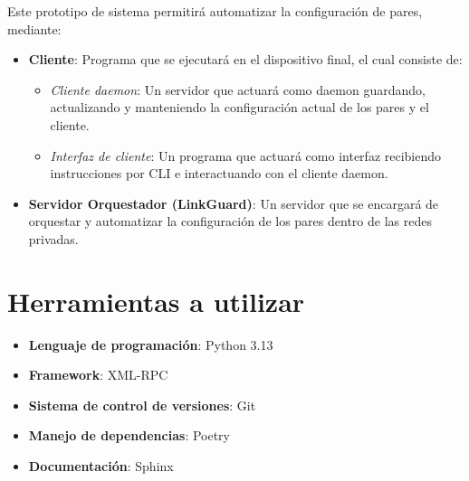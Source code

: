 Este prototipo de sistema permitirá automatizar la configuración de pares, mediante:
\begin{itemize}
    \item \textbf{Cliente}: Programa que se ejecutará en el dispositivo final, el cual consiste de:
    \begin{itemize}
        \item \textit{Cliente daemon}: Un servidor que actuará como daemon guardando, actualizando y manteniendo la configuración actual de los pares y el cliente.
        \item \textit{Interfaz de cliente}: Un programa que actuará como interfaz recibiendo instrucciones por CLI e interactuando con el cliente daemon.
    \end{itemize}
    \item \textbf{Servidor Orquestador (LinkGuard)}: Un servidor que se encargará de orquestar y automatizar la configuración de los pares dentro de las redes privadas.
\end{itemize}


\section{Herramientas a utilizar}
\begin{itemize}
    \item \textbf{Lenguaje de programación}: Python 3.13
    \item \textbf{Framework}: XML-RPC
    \item \textbf{Sistema de control de versiones}: Git
    \item \textbf{Manejo de dependencias}: Poetry
    \item \textbf{Documentación}: Sphinx
\end{itemize}